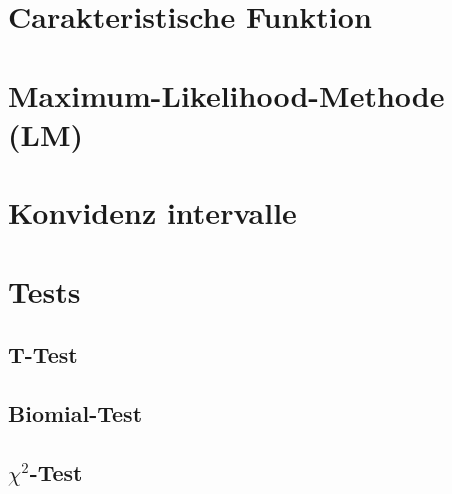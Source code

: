 \documentclass[a4paper, 11pt]{article}
\begin{document}
\section{Carakteristische Funktion}
\section{Maximum-Likelihood-Methode (LM)}
\section{Konvidenz intervalle}
\section{Tests}
\subsection{T-Test}
\subsection{Biomial-Test}
\subsection{$\chi^2$-Test}
\end{document}
